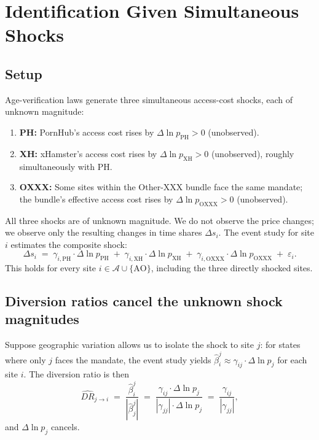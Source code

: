 \documentclass{article}
\begin{document}
\bigskip

\section{Identification Given Simultaneous Shocks}

\subsection{Setup}

Age-verification laws generate three simultaneous access-cost shocks,
each of unknown magnitude:
\begin{enumerate}
  \item \textbf{PH:} PornHub's access cost rises by $\Delta\ln p_{\mathrm{PH}}
    > 0$ (unobserved).
  \item \textbf{XH:} xHamster's access cost rises by $\Delta\ln p_{\mathrm{XH}}
    > 0$ (unobserved), roughly simultaneously with PH.
  \item \textbf{OXXX:} Some sites within the Other-XXX bundle face the same
    mandate; the bundle's effective access cost rises by $\Delta\ln
    p_{\mathrm{OXXX}} > 0$ (unobserved).
\end{enumerate}
All three shocks are of unknown magnitude.  We do not observe the price
changes; we observe only the resulting changes in time shares $\Delta s_i$.
The event study for site $i$ estimates the composite shock:
\begin{equation}\label{eq:obs}
  \Delta s_i
  \;=\; \gamma_{i,\mathrm{PH}} \cdot \Delta\ln p_{\mathrm{PH}}
  \;+\; \gamma_{i,\mathrm{XH}} \cdot \Delta\ln p_{\mathrm{XH}}
  \;+\; \gamma_{i,\mathrm{OXXX}} \cdot \Delta\ln p_{\mathrm{OXXX}}
  \;+\; \varepsilon_i.
\end{equation}
This holds for every site $i \in \mathcal{A} \cup \{\mathrm{AO}\}$, including
the three directly shocked sites.

\subsection{Diversion ratios cancel the unknown shock magnitudes}

Suppose geographic variation allows us to isolate the shock to site $j$:
for states where only $j$ faces the mandate, the event study yields
$\hat\beta_i^j \approx \gamma_{ij} \cdot \Delta\ln p_j$ for each site $i$.
The diversion ratio is then
\begin{equation}\label{eq:dr_estimable}
  \widehat{DR}_{j \to i}
  \;=\; \frac{\hat\beta_i^j}{\left|\hat\beta_j^j\right|}
  \;=\; \frac{\gamma_{ij} \cdot \Delta\ln p_j}
             {|\gamma_{jj}| \cdot \Delta\ln p_j}
  \;=\; \frac{\gamma_{ij}}{|\gamma_{jj}|},
\end{equation}
and $\Delta\ln p_j$ cancels.
\end{document}
